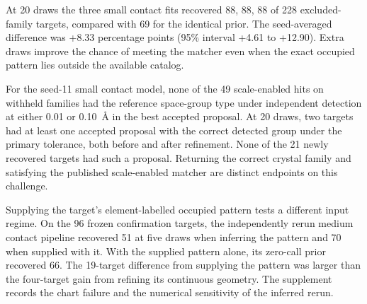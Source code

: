At 20 draws the three small contact fits recovered 88, 88, 88 of 228 excluded-family targets, compared with 69 for the identical prior. The seed-averaged difference was +8.33 percentage points (95\% interval +4.61 to +12.90). Extra draws improve the chance of meeting the matcher even when the exact occupied pattern lies outside the available catalog.

For the seed-11 small contact model, none of the 49 scale-enabled hits on withheld families had the reference space-group type under independent detection at either 0.01 or 0.10~\AA{} in the best accepted proposal. At 20 draws, two targets had at least one accepted proposal with the correct detected group under the primary tolerance, both before and after refinement. None of the 21 newly recovered targets had such a proposal. Returning the correct crystal family and satisfying the published scale-enabled matcher are distinct endpoints on this challenge.

Supplying the target's element-labelled occupied pattern tests a different input regime. On the 96 frozen confirmation targets, the independently rerun medium contact pipeline recovered 51 at five draws when inferring the pattern and 70 when supplied with it. With the supplied pattern alone, its zero-call prior recovered 66. The 19-target difference from supplying the pattern was larger than the four-target gain from refining its continuous geometry. The supplement records the chart failure and the numerical sensitivity of the inferred rerun.

